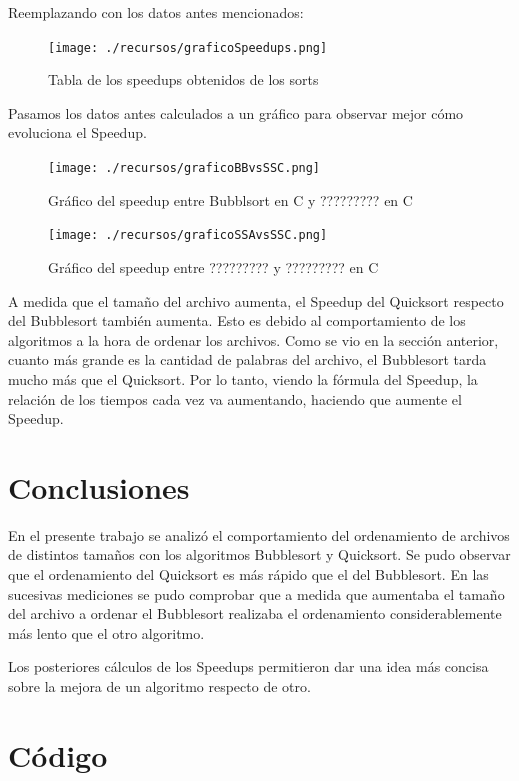 \documentclass[a4paper,10pt]{article}
\begin{document}
\bigskip
Reemplazando con los datos antes mencionados:

\begin{figure}[h!]
	\centering
	\texttt{[image: ./recursos/graficoSpeedups.png]}
	\caption{Tabla de los speedups obtenidos de los sorts}
\end{figure}

\bigskip
Pasamos los datos antes calculados a un gr\'afico para observar mejor c\'omo evoluciona el Speedup.
\begin{figure}[h!]
	\centering
	\texttt{[image: ./recursos/graficoBBvsSSC.png]}
	\caption{Gr\'afico del speedup entre Bubblsort en C y ????????? en C}
\end{figure}

\newpage
\begin{figure}[h!]
	\centering
	\texttt{[image: ./recursos/graficoSSAvsSSC.png]}
	\caption{Gr\'afico del speedup entre ????????? y ????????? en C}
\end{figure}

\bigskip
A medida que el tamaño del archivo aumenta, el Speedup del Quicksort respecto del Bubblesort también aumenta. Esto es debido al comportamiento de los algoritmos a la hora de ordenar los archivos. Como se vio en la sección anterior, cuanto más grande es la cantidad de palabras del archivo, el Bubblesort tarda mucho más que el Quicksort. Por lo tanto, viendo la fórmula del Speedup, la relación de los tiempos cada vez va aumentando, haciendo que aumente el Speedup.



\newpage
\section{Conclusiones}
En el presente trabajo se analizó el comportamiento del ordenamiento de archivos de distintos tamaños con los algoritmos Bubblesort y Quicksort. Se pudo observar que el ordenamiento del Quicksort es más rápido que el del Bubblesort. En las sucesivas mediciones se pudo comprobar que a medida que aumentaba el tamaño del archivo a ordenar el Bubblesort realizaba el ordenamiento considerablemente más lento que el otro algoritmo.

Los posteriores cálculos de los Speedups permitieron dar una idea más concisa sobre la mejora de un algoritmo respecto de otro.



\newpage
\section{C\'odigo}
\end{document}
